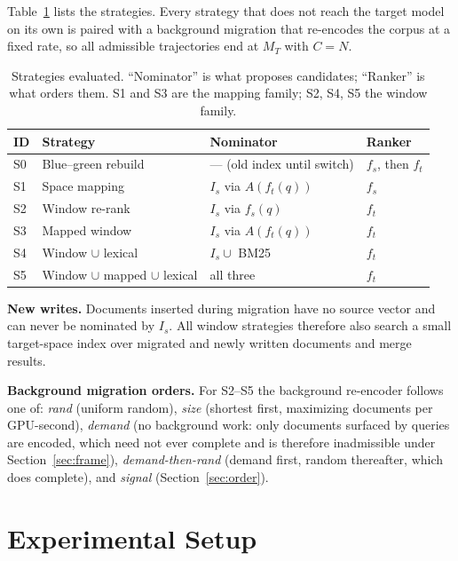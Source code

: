 \documentclass[conference]{IEEEtran}
\begin{document}
Table~\ref{tab:strategies} lists the strategies. Every strategy that does not reach the
target model on its own is paired with a background migration that re-encodes the corpus
at a fixed rate, so all admissible trajectories end at $M_T$ with $C = N$.

\begin{table}[t]
\centering
\caption{Strategies evaluated. ``Nominator'' is what proposes candidates; ``Ranker''
is what orders them. S1 and S3 are the mapping family; S2, S4, S5 the window family.}
\label{tab:strategies}
\small
\begin{tabular}{@{}llll@{}}
\toprule
ID & Strategy & Nominator & Ranker \\
\midrule
S0 & Blue--green rebuild & --- (old index until switch) & $f_s$, then $f_t$ \\
S1 & Space mapping~\cite{drift-adapter} & $I_s$ via $A(f_t(q))$ & $f_s$ \\
S2 & Window re-rank~\cite{embedflow,thaw-anon} & $I_s$ via $f_s(q)$ & $f_t$ \\
S3 & Mapped window & $I_s$ via $A(f_t(q))$ & $f_t$ \\
S4 & Window $\cup$ lexical & $I_s \cup$ BM25~\cite{bm25} & $f_t$ \\
S5 & Window $\cup$ mapped $\cup$ lexical & all three & $f_t$ \\
\bottomrule
\end{tabular}
\end{table}

\textbf{New writes.} Documents inserted during migration have no source vector and can
never be nominated by $I_s$. All window strategies therefore also search a small
target-space index over migrated and newly written documents and merge results.

\textbf{Background migration orders.} For S2--S5 the background re-encoder follows one
of: \emph{rand} (uniform random), \emph{size} (shortest first, maximizing documents per
GPU-second), \emph{demand} (no background work: only documents surfaced by queries are
encoded, which need not ever complete and is therefore inadmissible under
Section~\ref{sec:frame}), \emph{demand-then-rand} (demand first, random thereafter, which
does complete), and \emph{signal} (Section~\ref{sec:order}).

\section{Experimental Setup}\label{sec:setup}
\end{document}
